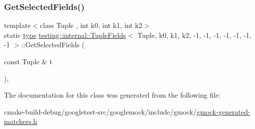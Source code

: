 \subsubsection{\texorpdfstring{GetSelectedFields()}{GetSelectedFields()}}
{\footnotesize\ttfamily template$<$class Tuple , int k0, int k1, int k2$>$ \\
static \mbox{\hyperlink{classtesting_1_1internal_1_1TupleFields_3_01Tuple_00_01k0_00_01k1_00_01k2_00_01-1_00_01-1_00_01-d40fb0064dd627afc9c2b7f6513ffcb3_a2ae5a8ddd1bd868f6905cfde5105f49e}{type}} \mbox{\hyperlink{classtesting_1_1internal_1_1TupleFields}{testing\+::internal\+::\+Tuple\+Fields}}$<$ Tuple, k0, k1, k2, -\/1, -\/1, -\/1, -\/1, -\/1, -\/1, -\/1 $>$\+::Get\+Selected\+Fields (\begin{DoxyParamCaption}\item[{const Tuple \&}]{t }\end{DoxyParamCaption})\hspace{0.3cm}{\ttfamily [inline]}, {\ttfamily [static]}}



The documentation for this class was generated from the following file\+:\begin{DoxyCompactItemize}
\item 
cmake-\/build-\/debug/googletest-\/src/googlemock/include/gmock/\mbox{\hyperlink{gmock-generated-matchers_8h}{gmock-\/generated-\/matchers.\+h}}\end{DoxyCompactItemize}
